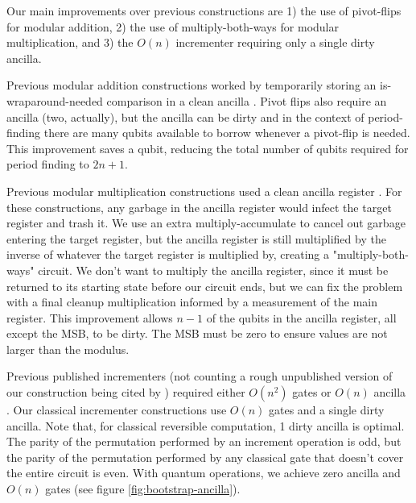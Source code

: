 \documentclass[twocolumn]{article}
\begin{document}
Our main improvements over previous constructions are 1) the use of pivot-flips for modular addition, 2) the use of multiply-both-ways for modular multiplication, and 3) the $O(n)$ incrementer requiring only a single dirty ancilla.

Previous modular addition constructions worked by temporarily storing an is-wraparound-needed comparison in a clean ancilla \cite{takahashi2006, haner2016}.
Pivot flips also require an ancilla (two, actually), but the ancilla can be dirty and in the context of period-finding there are many qubits available to borrow whenever a pivot-flip is needed.
This improvement saves a qubit, reducing the total number of qubits required for period finding to $2n+1$.

Previous modular multiplication constructions used a clean ancilla register \cite{haner2016}.
For these constructions, any garbage in the ancilla register would infect the target register and trash it.
We use an extra multiply-accumulate to cancel out garbage entering the target register, but the ancilla register is still multiplified by the inverse of whatever the target register is multiplied by, creating a "multiply-both-ways" circuit.
We don't want to multiply the ancilla register, since it must be returned to its starting state before our circuit ends, but we can fix the problem with a final cleanup multiplication informed by a measurement of the main register.
This improvement allows $n-1$ of the qubits in the ancilla register, all except the MSB, to be dirty.
The MSB must be zero to ensure values are not larger than the modulus.

Previous published incrementers (not counting a rough unpublished version of our construction \cite{gidney2015} being cited by \cite{haner2016}) required either $O(n^2)$ gates or $O(n)$ ancilla \cite{draper2000, barenco1995}.
Our classical incrementer constructions use $O(n)$ gates and a single dirty ancilla.
Note that, for classical reversible computation, 1 dirty ancilla is optimal.
The parity of the permutation performed by an increment operation is odd, but the parity of the permutation performed by any classical gate that doesn't cover the entire circuit is even.
With quantum operations, we achieve zero ancilla and $O(n)$ gates (see figure \ref{fig:bootstrap-ancilla}).
\end{document}
